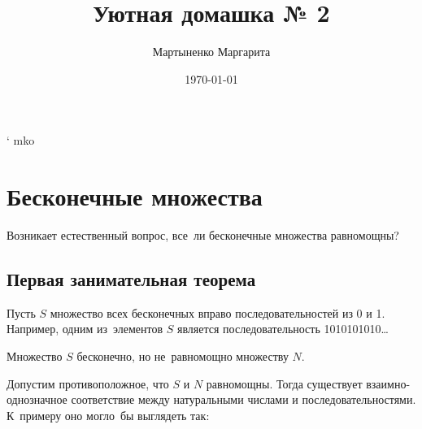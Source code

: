 \documentclass[12pt, a4paper]{article}
\author{Мартыненко Маргарита}
\title{Уютная домашка № 2}
\date{\today}
\begin{document}
 
\maketitle
\newpage` mko
\section{Бесконечные множества} 

Возникает естественный вопрос, все~ли бесконечные множества равномощны?

\subsection{Первая занимательная теорема}

Пусть $S$ множество всех бесконечных вправо последовательностей из 0 и 1. Например, одним из~элементов $S$ является последовательность 1010101010\ldots

Множество $S$ бесконечно, но не~равномощно множеству $N$.

Допустим противоположное, что $S$ и $N$ равномощны. Тогда существует взаимно-однозначное соответствие между натуральными числами и последовательностями. К~примеру оно могло~бы выглядеть так:
\end{document}

